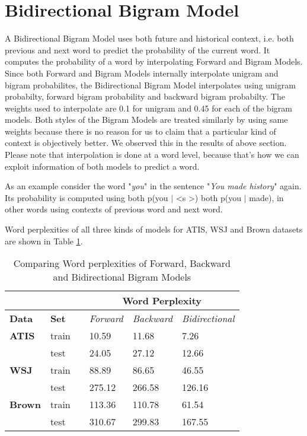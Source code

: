 \documentclass{article}
\begin{document}
\section{Bidirectional Bigram Model}
A Bidirectional Bigram Model uses both future and historical context, i.e. both previous and next word to predict the probability of the current word. It computes the probability of a word by interpolating Forward and Bigram Models. Since both Forward and Bigram Models internally interpolate unigram and bigram probabilites, the Bidirectional Bigram Model interpolates using unigram probabilty, forward bigram probability and backward bigram probabilty. The weights used to interpolate are 0.1 for unigram and 0.45 for each of the bigram models. Both styles of the Bigram Models are treated similarly by using same weights because there is no reason for us to claim that a particular kind of context is objectively better. We observed this in the results of above section. Please note that interpolation is done at a word level, because that's how we can exploit information of both models to predict a word.

As an example consider the word "\textit{you}" in the sentence "\textit{You made history}" again. Its probability is computed using both p(you $|$ \textless s \textgreater) both p(you $|$ made), in other words using contexts of previous word and next word.

Word perplexities of all three kinds of models for ATIS, WSJ and Brown datasets are shown in Table \ref{all}.
\begin{table}[h]
\centering
\begin{tabular}{@{}llllll@{}}
\toprule
\textbf{}      & \textbf{}    &  & \multicolumn{3}{c}{\textbf{Word Perplexity}}                  \\ \midrule
\textbf{Data}  & \textbf{Set} &  & \textit{Forward} & \textit{Backward} & \textit{Bidirectional} \\ \midrule
\textbf{ATIS}  & train        &  & 10.59           & 11.68             & 7.26                  \\ \midrule
               & test         &  & 24.05           & 27.12            & 12.66                 \\ \midrule
\textbf{WSJ}   & train        &  & 88.89           & 86.65            & 46.55                 \\ \midrule
               & test         &  & 275.12           & 266.58           & 126.16                \\ \midrule
\textbf{Brown} & train        &  & 113.36          & 110.78            & 61.54                  \\ \midrule
               & test         &  & 310.67          & 299.83           & 167.55               \\ \bottomrule
\end{tabular}
\caption{Comparing Word perplexities of Forward, Backward and Bidirectional Bigram Models}
\label{all}
\end{table}
\end{document}
